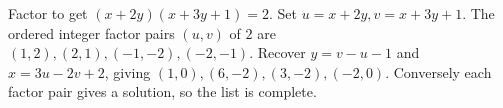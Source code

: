Factor to get $(x+2y)(x+3y+1)=2$. Set $u=x+2y,v=x+3y+1$. The ordered integer factor pairs $(u,v)$ of $2$ are $(1,2),(2,1),(-1,-2),(-2,-1)$. Recover $y=v-u-1$ and $x=3u-2v+2$, giving $\boxed{(1,0),(6,-2),(3,-2),(-2,0)}$. Conversely each factor pair gives a solution, so the list is complete.
